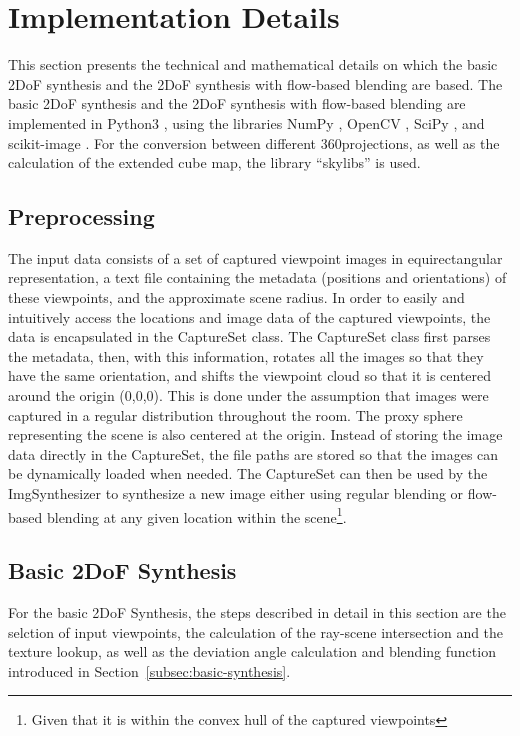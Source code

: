 \section{Implementation Details} \label{sec:impl_details}
This section presents the technical and mathematical details on which the basic 2DoF synthesis and the 2DoF synthesis with flow-based blending are based. 
The basic 2DoF synthesis and the 2DoF synthesis with flow-based blending are implemented in Python3 \cite{python}, using the libraries NumPy \cite{numpy}, OpenCV \cite{opencv}, SciPy \cite{scipy}, and scikit-image \cite{skimage}. For the conversion between different 360\degree projections, as well as the calculation of the extended cube map, the library ``skylibs'' \cite{skylibs} is used.


\subsection{Preprocessing}
The input data consists of a set of captured viewpoint images in equirectangular representation, a text file containing the metadata (positions and orientations) of these viewpoints, and the approximate scene radius. In order to easily and intuitively access the locations and image data of the captured viewpoints, the data is encapsulated in the CaptureSet class. The CaptureSet class first parses the metadata, then, with this information, rotates all the images so that they have the same orientation, and shifts the viewpoint cloud so that it is centered around the origin (0,0,0). This is done under the assumption that images were captured in a regular distribution throughout the room. The proxy sphere representing the scene is also centered at the origin. Instead of storing the image data directly in the CaptureSet, the file paths are stored so that the images can be dynamically loaded when needed. The CaptureSet can then be used by the ImgSynthesizer to synthesize a new image either using regular blending or flow-based blending at any given location within the scene\footnote{Given that it is within the convex hull of the captured viewpoints}.

\subsection{Basic 2DoF Synthesis}
For the basic 2DoF Synthesis, the steps described in detail in this section are the selction of input viewpoints, the calculation of the ray-scene intersection and the texture lookup, as well as the deviation angle calculation and blending function introduced in Section~\ref{subsec:basic-synthesis}.

